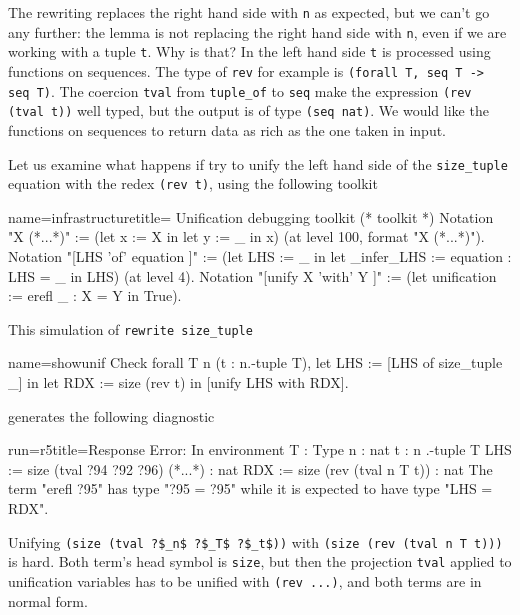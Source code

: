The rewriting replaces the right hand side with \lstinline/n/ as
expected, but we can't go any further: the lemma is not replacing
the right hand side with \lstinline/n/, even if we are working
with a tuple \lstinline/t/.  Why is that?  In the left hand side
\lstinline/t/ is processed using functions on sequences.
The type of \lstinline/rev/ for example is
\lstinline/(forall T, seq T -> seq T)/.  The coercion \lstinline/tval/
from \lstinline/tuple_of/ to \lstinline/seq/ make the
expression \lstinline/(rev (tval t))/ well typed, but the output
is of type \lstinline/(seq nat)/.  
We would like the functions on sequences to return
data as rich as the one taken in input.

Let us examine what happens if try to unify the left hand side of the
\lstinline/size_tuple/ equation with the redex
\lstinline/(rev t)/, using the following toolkit

\begin{coq}{name=infrastructure}{title= Unification debugging toolkit}
(* toolkit *)
Notation "X (*...*)" := (let x := X in let y := _ in x)
  (at level 100, format "X  (*...*)").
Notation "[LHS 'of' equation ]" :=
  (let LHS := _ in
   let _infer_LHS := equation : LHS = _ in LHS)
  (at level 4).
Notation "[unify X 'with' Y ]" :=
  (let unification := erefl _ : X = Y in
   True).
\end{coq}

This simulation of \lstinline/rewrite size_tuple/

\begin{coq}{name=showunif}{}
Check forall T n (t : n.-tuple T),
 let LHS := [LHS of size_tuple _] in
 let RDX := size (rev t) in
 [unify LHS with RDX].
\end{coq}

generates the following diagnostic

\begin{coqout}{run=r5}{title=Response}
Error:
In environment
T : Type
n : nat
t : n .-tuple T
LHS := size (tval ?94 ?92 ?96) (*...*) : nat
RDX := size (rev (tval n T t))           : nat
The term "erefl ?95" has type "?95 = ?95" while
it is expected to have type "LHS = RDX".
\end{coqout}

Unifying \lstinline/(size (tval ?$_n$ ?$_T$ ?$_t$))/
with \lstinline/(size (rev (tval n T t)))/ is hard.
Both term's head symbol is \lstinline/size/, but then
the projection \lstinline/tval/ applied to unification
variables has to be unified with \lstinline/(rev ...)/,
and both terms are in normal form.

